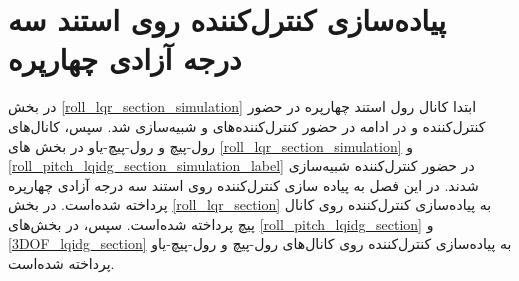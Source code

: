 \chapter{پیاده‌سازی کنترل‌کننده روی استند سه درجه آزادی چهارپره}

 در بخش
\ref{roll_lqr_section_simulation}
ابتدا کانال رول استند چهارپره در حضور کنترل‌کننده  و در ادامه در حضور کنترل‌کننده‌های  و  شبیه‌سازی شد. سپس، کانال‌های رول-پیچ و رول-پیچ-یاو در بخش های
\ref{roll_lqr_section_simulation}
و
\ref{roll_pitch_lqidg_section_simulation_label}
در حضور کنترل‌کننده   شبیه‌سازی شدند. 
در این فصل به پیاده سازی کنترل‌کننده روی استند سه درجه آزادی چهارپره پرداخته شده‌است. در بخش 
\ref{roll_lqr_section}
به پیاده‌سازی کنترل‌کننده روی کانال پیچ پرداخته شده‌است. سپس، در بخش‌های 
\ref{roll_pitch_lqidg_section}
و
\ref{3DOF_lqidg_section}
به پیاده‌سازی کنترل‌کننده روی کانال‌های رول-پیچ و رول-پیچ-یاو پرداخته شده‌است. 
